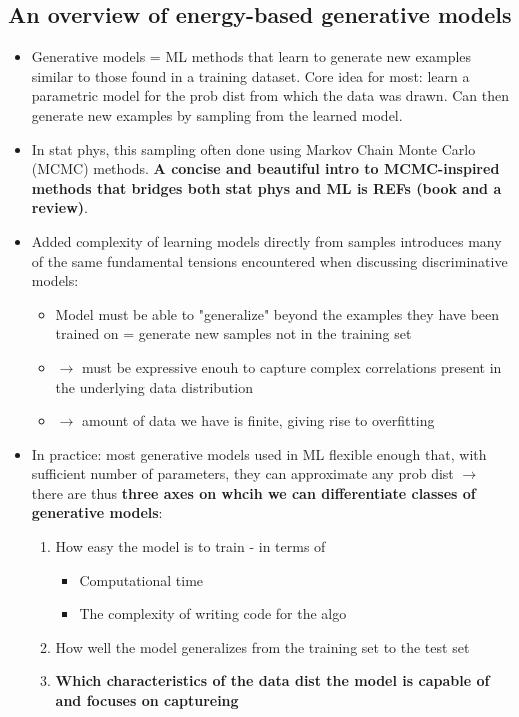 \documentclass[norsk,a4paper,11pt]{article}
\begin{document}
\subsection{An overview of energy-based generative models}
\begin{itemize}
	\item Generative models = ML methods that learn to generate new examples similar to those found in a training dataset. Core idea for most: learn a parametric model for the prob dist from which the data was drawn. Can then generate new examples by sampling from the learned model. 
	\item In stat phys, this sampling often done using Markov Chain Monte Carlo (MCMC) methods. \textbf{A concise and beautiful intro to MCMC-inspired methods that bridges both stat phys and ML is REFs (book and a review)}.
	\item Added complexity of learning models directly from samples introduces many of the same fundamental tensions encountered when discussing discriminative models:
	\begin{itemize}
		\item Model must be able to "generalize" beyond the examples they have been trained on = generate new samples not in the training set
		\item $\rightarrow$ must be expressive enouh to capture complex correlations present in the underlying data distribution
		\item $\rightarrow$ amount of data we have is finite, giving rise to overfitting
	\end{itemize}
	\item In practice: most generative models used in ML flexible enough that, with sufficient number of parameters, they can approximate any prob dist $\rightarrow$ there are thus \textbf{three axes on whcih we can differentiate classes of generative models}:
	\begin{enumerate}
		\item How easy the model is to train - in terms of
		\begin{itemize}
			\item Computational time
			\item The complexity of writing code for the algo
		\end{itemize}
		\item How well the model generalizes from the training set to the test set
		\item \textbf{Which characteristics of the data dist the model is capable of and focuses on captureing}

\end{enumerate}
\end{itemize}
\end{document}
